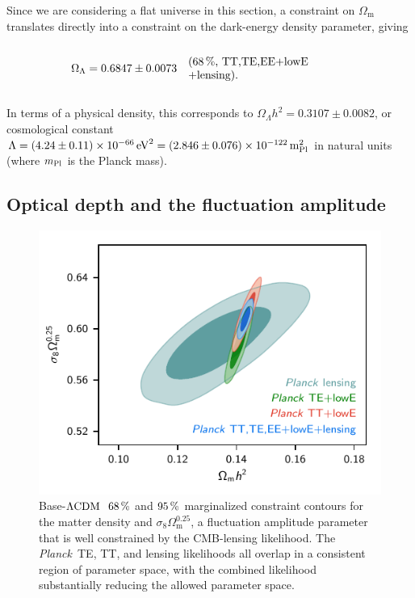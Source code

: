 \documentclass[longauth,traditabstract]{aa}
\def\Planck{\textit{Planck}}
\def\,{\thinspace}
\newcommand{\leftparbox}[2]{\parbox{#1}{\begin{flushleft} #2 \end{flushleft}}}
\newcommand{\oneonesig}[4][5cm]{
\begin{equation}
\left.
  #2 \quad\mbox{\text{\leftparbox{#1}{(68\,\%,~#3)#4}}}
  \right.
\end{equation}
}
\newcommand{\mksym}[1]{\ifmmode {\rm #1}\else #1\fi}
\newcommand{\dataplus}{\allowbreak+}
\newcommand{\lensing}{\mksym{lensing}}
\newcommand{\TTTEEE}{\mksym{TT,TE,EE}}
\newcommand{\lowE}{\mksym{lowE}}
\newcommand{\shortall}{\TTTEEE\dataplus\lowE}
\newcommand{\lcdm}{\texorpdfstring{{$\rm{\Lambda CDM}$}}{ΛCDM}}
\providecommand{\text}[1]{\rm{#1}}
\newcommand{\eV}{\,\text{eV}}
\providecommand{\Omm}{\Omega_{\mathrm{m}}}
\newcommand{\planck}{\Planck}
\begin{document}
Since we are considering a flat universe in this section,
a constraint on $\Omm$ translates directly into a constraint on the dark-energy density parameter, giving
\oneonesig{\Omega_\Lambda=0.6847 \pm 0.0073}{\shortall\dataplus\lensing}{.}
In terms of a physical density, this corresponds to $\Omega_\Lambda h^2 = 0.3107\pm 0.0082$, or cosmological constant $\Lambda = (4.24\pm 0.11) \times10^{-66}\eV^2
=(2.846\pm 0.076)\times 10^{-122}\,m_{\rm Pl}^2$ in natural units (where $m_{\rm Pl}$ is the Planck mass).


\subsection{Optical depth and the fluctuation amplitude}
\label{subsec:amplitudes}

\begin{figure}
\begin{center}
\includegraphics[width=\columnwidth]{lensing-ommh2.pdf}
\end{center}
\caption {
Base-\lcdm\ $68\,\%$ and $95\,\%$ marginalized constraint contours for the matter density and $\sigma_8 \Omm^{0.25}$, a fluctuation amplitude parameter that is well constrained by the CMB-lensing likelihood. The \planck\ TE, TT, and lensing likelihoods all overlap in a consistent region of parameter space, with the
combined likelihood substantially reducing the allowed parameter space.
}
\label{fig:lensingommh2}
\end{figure}
\end{document}
